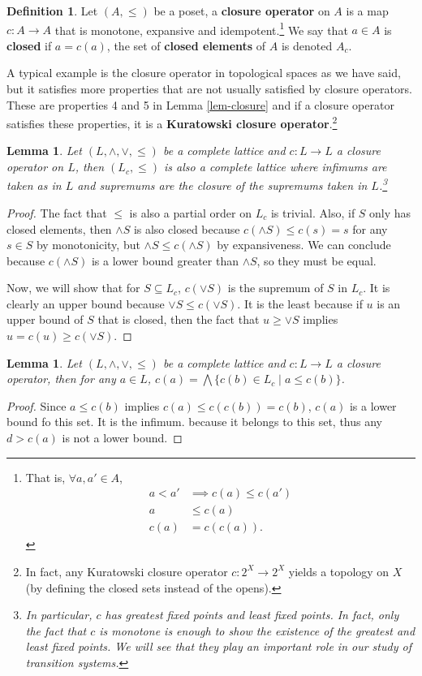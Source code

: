 \documentclass{tufte-handout} %
\newtheorem{lem}[thm]{Lemma}
\theoremstyle{definition}
\newtheorem{defn}[thm]{Definition}
\theoremstyle{remark}
\newcommand{\0}{\textsf{0}}
\newcommand{\1}{\textsf{1}}
\begin{document}
\begin{defn}
	Let $(A, \leq)$ be a poset, a \textbf{closure operator} on $A$ is a map $c: A \rightarrow A$ that is monotone, expansive and idempotent.\footnote{That is, $\forall a, a' \in A$, \begin{align*}
		a < a' &\implies c(a) \leq c(a')\\
		a &\leq c(a)\\ 
		c(a) &= c(c(a)).
		\end{align*}} We say that $a \in A$ is \textbf{closed} if $a = c(a)$, the set of \textbf{closed elements} of $A$ is denoted $A_c$.
\end{defn}
A typical example is the closure operator in topological spaces as we have said, but it satisfies more properties that are not usually satisfied by closure operators. These are properties 4 and 5 in Lemma \ref{lem-closure} and if a closure operator satisfies these properties, it is a \textbf{Kuratowski closure operator}.\footnote{In fact,  any Kuratowski closure operator $c:2^X \rightarrow 2^X$ yields a topology on $X$ (by defining the closed sets instead of the opens).}
\begin{lem}
	Let $(L,\wedge, \vee, \leq)$ be a complete lattice and $c:L\rightarrow L$ a closure operator on $L$, then $(L_c, \leq)$ is also a complete lattice where infimums are taken as in $L$ and supremums are the closure of the supremums taken in $L$.\footnote{In particular, $c$ has greatest fixed points and least fixed points. In fact, only the fact that $c$ is monotone is enough to show the existence of the greatest and least fixed points. We will see that they play an important role in our study of transition systems.}%
\end{lem}
\begin{proof}
	The fact that $\leq$ is also a partial order on $L_c$ is trivial. Also, if $S$ only has closed elements, then $\wedge S$ is also closed because $c(\wedge S) \leq c(s) = s$ for any $s \in S$ by monotonicity, but $\wedge S \leq c(\wedge S)$ by expansiveness. We can conclude because $c(\wedge S)$ is a lower bound greater than $\wedge S$, so they must be equal.
	
	Now, we will show that for $S \subseteq L_c$, $c(\vee S)$ is the supremum of $S$ in $L_c$. It is clearly an upper bound because $\vee S \leq c(\vee S)$. It is the least because if $u$ is an upper bound of $S$ that is closed, then the fact that $u \geq \vee S$ implies $u = c(u) \geq c(\vee S)$.
\end{proof}
\begin{lem}%
	Let $(L,\wedge, \vee, \leq)$ be a complete lattice and $c:L\rightarrow L$ a closure operator, then for any $a \in L$, $c(a) = \bigwedge \{c(b) \in L_c \mid a\leq c(b)\}$.
\end{lem}
\begin{proof}
	Since $a \leq c(b)$ implies $c(a) \leq c(c(b)) = c(b)$, $c(a)$ is a lower bound fo this set. It is the infimum. because it belongs to this set, thus any $d > c(a)$ is not a lower bound.
\end{proof}
\end{document}
